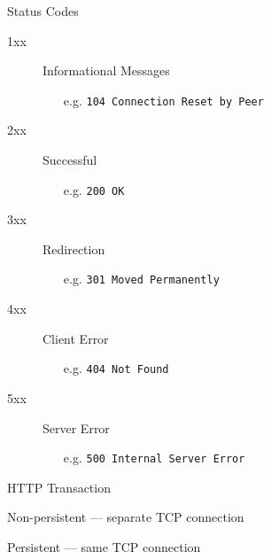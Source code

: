 \begin{frame}{Status Codes}
  \begin{description}
  \item[1xx] Informational Messages
    \begin{itemize}
    \item[e.g.] \texttt{104 Connection Reset by Peer}
    \end{itemize}
  \item[2xx] Successful
    \begin{itemize}
    \item[e.g.] \texttt{200 OK}
    \end{itemize}
  \item[3xx] Redirection
    \begin{itemize}
    \item[e.g.] \texttt{301 Moved Permanently}
    \end{itemize}
  \item[4xx] Client Error
    \begin{itemize}
    \item[e.g.] \texttt{404 Not Found}
    \end{itemize}
  \item[5xx] Server Error
    \begin{itemize}
    \item[e.g.] \texttt{500 Internal Server Error}
    \end{itemize}
  \end{description}
\end{frame}

\begin{frame}{HTTP Transaction}
  \begin{iblock}{Non-persistent --- separate TCP connection}
    \begin{center}
    \end{center}
  \end{iblock}
\end{frame}

\begin{frame}
  \begin{iblock}{Persistent --- same TCP connection}
    \begin{center}
    \end{center}
  \end{iblock}
\end{frame}

